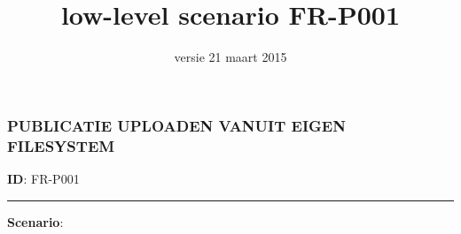 \documentclass{article}
\begin{document}
\date{versie 21 maart 2015}
\title{low-level scenario FR-P001}
\maketitle


\subsubsection*{PUBLICATIE UPLOADEN VANUIT EIGEN FILESYSTEM}
\vspace{2 mm}

\textbf{ID}: FR-P001
\vspace{2 mm}



\hrule
\vspace{2 mm}
\noindent \textbf{Scenario}:
\end{document}
